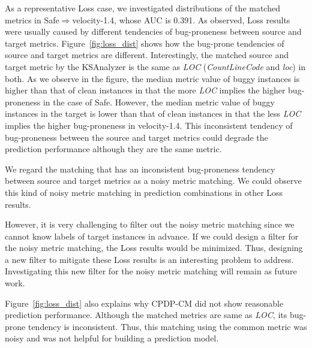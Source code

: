 As a representative Loss case, we investigated distributions of the matched metrics in Safe$\Rightarrow$velocity-1.4, whose AUC is 0.391.
As observed, Loss results were usually caused by different tendencies of
bug-proneness between source and target metrics. Figure~\ref{fig:loss_dist}
shows how the bug-prone tendencies of source and target metrics are different.
Interestingly, the matched source and target metric by the KSAnalyzer is the
same as {\em LOC} ({\em CountLineCode} and {\em loc}) in both.
As we observe in the figure, the median metric value of buggy instances is higher than that of clean instances in that the more {\em LOC}
implies the higher bug-proneness in the case of Safe. However, the median metric value of
buggy instances in the target is lower than that of clean instances
in that the less {\em LOC} implies the higher bug-proneness in
velocity-1.4. This inconsistent tendency of
bug-proneness between the source and target metrics could degrade the
prediction performance although they are the same metric.

We regard the matching that has an inconsistent bug-proneness tendency between
source and target metrics as a noisy metric matching.
We could observe this kind of noisy metric matching in
prediction combinations in other Loss results.

However, it is very challenging to filter out the noisy metric matching since we
cannot know labels of target instances in
advance. If we could design a filter for the noisy metric matching, the Loss
results would be minimized. Thus, designing a new filter to mitigate these Loss
results is an interesting problem to address. Investigating this new filter
for the noisy metric matching will remain as future work.

Figure~\ref{fig:loss_dist} also explains why CPDP-CM did not show reasonable
prediction performance. Although the matched metrics are same
as {\em LOC}, its bug-prone tendency is inconsistent. Thus, this matching using
the common metric was noisy and was not helpful for building a prediction model.




